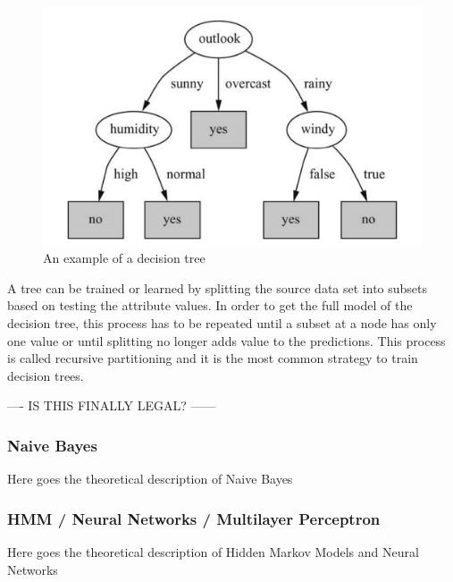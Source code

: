 \begin{figure}[!ht]
	\centering
		\includegraphics[width=1.0\textwidth]{images/decision-tree}
	\caption{An example of a decision tree}
	\label{fig:image-decision-tree}
\end{figure}

A tree can be trained or learned by splitting the source data set into subsets based on testing the attribute values. In order to get the full model of the decision tree, this process has to be repeated until a subset at a node has only one value or until splitting no longer adds value to the predictions. This process is called recursive partitioning and it is the most common strategy to train decision trees.


---- IS THIS FINALLY LEGAL? ------


\subsubsection{Naive Bayes}
Here goes the theoretical description of Naive Bayes

\subsubsection{HMM / Neural Networks / Multilayer Perceptron}
Here goes the theoretical description of Hidden Markov Models and Neural Networks
